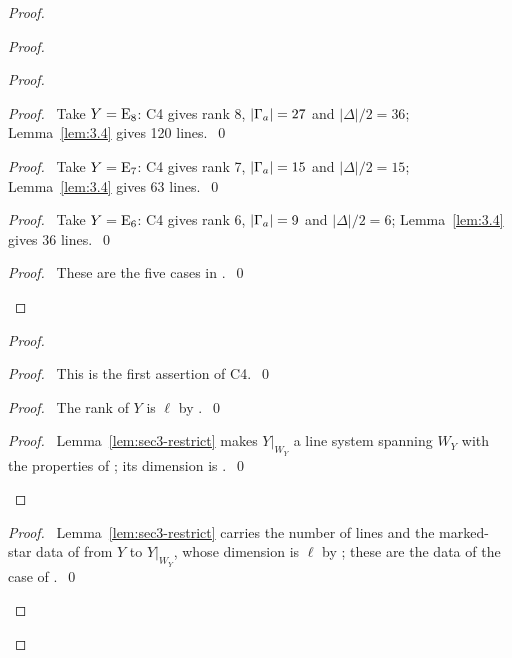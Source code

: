 \begin{proof}
\begin{proof}
\begin{proof}
   \begin{proof}\pf\ Take $Y=\mathrm{E}_8$: C4 gives rank 8, $|\Gamma_a|=27$ and
    $|\Delta|/2=36$; Lemma~\ref{lem:3.4} gives 120 lines.~\qed\end{proof}
   \begin{proof}\pf\ Take $Y=\mathrm{E}_7$: C4 gives rank 7, $|\Gamma_a|=15$ and
    $|\Delta|/2=15$; Lemma~\ref{lem:3.4} gives 63 lines.~\qed\end{proof}
   \begin{proof}\pf\ Take $Y=\mathrm{E}_6$: C4 gives rank 6, $|\Gamma_a|=9$ and
    $|\Delta|/2=6$; Lemma~\ref{lem:3.4} gives 36 lines.~\qed\end{proof}
   \qedstep
   \begin{proof}\pf\ These are the five cases in .~\qed\end{proof}
  \end{proof}
  \begin{proof}
   \begin{proof}\pf\ This is the first assertion of C4.~\qed\end{proof}
   \begin{proof}\pf\ The rank of $Y$ is $\ell$ by .~\qed\end{proof}
   \qedstep
   \begin{proof}\pf\ Lemma~\ref{lem:sec3-restrict} makes $Y|_{W_Y}$ a line system
    spanning $W_Y$ with the properties of ; its dimension is
    .~\qed\end{proof}
  \end{proof}
  \begin{proof}\pf\ Lemma~\ref{lem:sec3-restrict} carries the number of lines and the
   marked-star data of  from $Y$ to $Y|_{W_Y}$, whose dimension is
   $\ell$ by ; these are the data of the case of
   .~\qed\end{proof}

\end{proof}
\end{proof}
